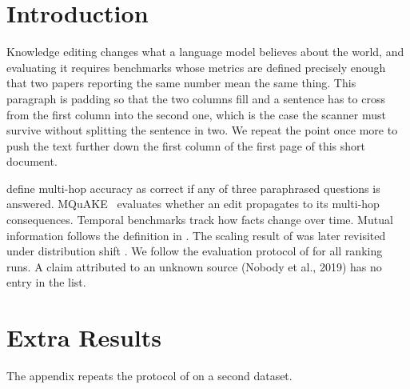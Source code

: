 \documentclass[twocolumn]{article}
\begin{document}
\section{Introduction}
Knowledge editing changes what a language model believes about the world, and evaluating it requires benchmarks whose metrics are defined precisely enough that two papers reporting the same number mean the same thing.
This paragraph is padding so that the two columns fill and a sentence has to cross from the first column into the second one, which is the case the scanner must survive without splitting the sentence in two.
We repeat the point once more to push the text further down the first column of the first page of this short document.

\citet{zhong2023mquake} define multi-hop accuracy as correct if any of three paraphrased questions is answered.
MQuAKE~\citep{zhong2023mquake} evaluates whether an edit propagates to its multi-hop consequences.
Temporal benchmarks \citep{jang2022temporalwiki,zhong2023mquake} track how facts change over time.
Mutual information follows the definition in \citet{cover2006elements}.
The scaling result of \citet{smith2020first} was later revisited under distribution shift \citep{smith2020second}.
We follow the evaluation protocol of \citet{bao2023tallrec} for all ranking runs.
A claim attributed to an unknown source (Nobody et al., 2019) has no entry in the list.


\appendix
\section{Extra Results}
The appendix repeats the protocol of \citet{bao2023tallrec} on a second dataset.
\end{document}
